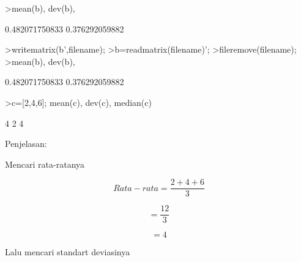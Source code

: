 \documentclass{article}
\begin{document}
\begin{eulernotebook}
\begin{eulercomment}
\begin{eulercomment}
\begin{euleroutput}
  [0.978964,  0.0367821,  0.191109,  0.642479,  0.233536,  0.0910807,
  0.899334,  0.983636,  0.21102,  0.552777]
\end{euleroutput}
\begin{eulerprompt}
>mean(b), dev(b),
\end{eulerprompt}
\begin{euleroutput}
  0.482071750833
  0.376292059882
\end{euleroutput}
\begin{eulerprompt}
>writematrix(b',filename);
>b=readmatrix(filename)';
>fileremove(filename);
>mean(b), dev(b),
\end{eulerprompt}
\begin{euleroutput}
  0.482071750833
  0.376292059882
\end{euleroutput}
\begin{eulerprompt}
>c=[2,4,6]; mean(c), dev(c), median(c)
\end{eulerprompt}
\begin{euleroutput}
  4
  2
  4
\end{euleroutput}
\begin{eulercomment}
Penjelasan:

Mencari rata-ratanya\\
\end{eulercomment}
\begin{eulerformula}
\[
Rata-rata= \frac{2+4+6}{3}
\]
\end{eulerformula}
\begin{eulerformula}
\[
= \frac{12}{3}
\]
\end{eulerformula}
\begin{eulerformula}
\[
= 4
\]
\end{eulerformula}
\begin{eulercomment}
Lalu mencari standart deviasinya


\end{eulercomment}
\end{eulercomment}
\end{eulercomment}
\end{eulernotebook}
\end{document}
